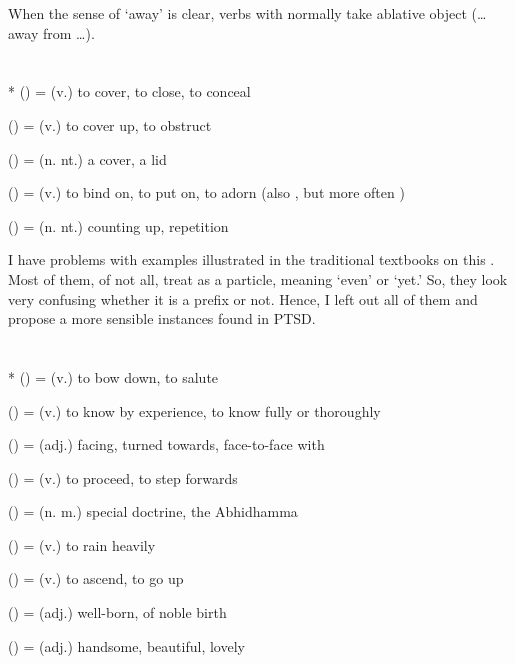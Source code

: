 When the sense of `away' is clear, verbs with  normally take ablative object (\dots away from \dots).

\section*{}\label{upasagga:api}
\begin{compactitem}
\item {}* () = (v.) to cover, to close, to conceal
\item {} () = (v.) to cover up, to obstruct
\item {} () = (n. nt.) a cover, a lid 
\item {} () = (v.) to bind on, to put on, to adorn (also , but more often )
\item {} () = (n. nt.) counting up, repetition
\end{compactitem}

I have problems with examples illustrated in the traditional textbooks on this . Most of them, of not all, treat  as a particle, meaning `even' or `yet.' So, they look very confusing whether it is a prefix or not. Hence, I left out all of them and propose a more sensible instances found in PTSD.

\section*{}\label{upasagga:abhi}
\begin{compactitem}
\item {}* () = (v.) to bow down, to salute 
\item {} () = (v.) to know by experience, to know fully or thoroughly
\item {} () = (adj.) facing, turned towards, face-to-face with 
\item {} () = (v.) to proceed, to step forwards
\item {} () = (n. m.) special doctrine, the Abhidhamma 
\item {} () = (v.) to rain heavily
\item {} () = (v.) to ascend, to go up 
\item {} () = (adj.) well-born, of noble birth 
\item {} () = (adj.) handsome, beautiful, lovely
\end{compactitem}

